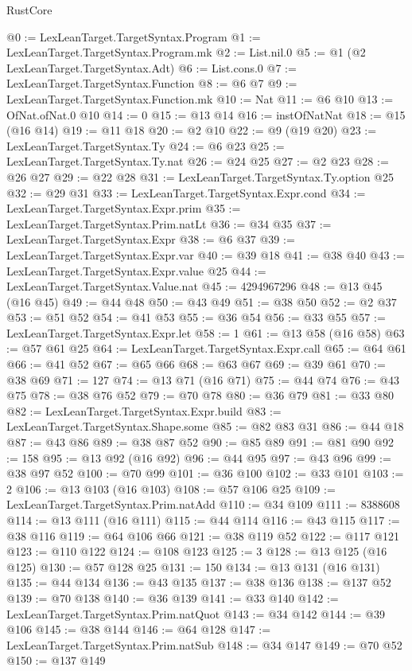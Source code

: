 \begin{lexlean}{RustCore}
\begin{coremodule}
@0 := LexLeanTarget.TargetSyntax.Program
@1 := LexLeanTarget.TargetSyntax.Program.mk
@2 := List.nil.{0}
@5 := @1 (@2 LexLeanTarget.TargetSyntax.Adt)
@6 := List.cons.{0}
@7 := LexLeanTarget.TargetSyntax.Function
@8 := @6 @7
@9 := LexLeanTarget.TargetSyntax.Function.mk
@10 := Nat
@11 := @6 @10
@13 := OfNat.ofNat.{0} @10
@14 := 0
@15 := @13 @14
@16 := instOfNatNat
@18 := @15 (@16 @14)
@19 := @11 @18
@20 := @2 @10
@22 := @9 (@19 @20)
@23 := LexLeanTarget.TargetSyntax.Ty
@24 := @6 @23
@25 := LexLeanTarget.TargetSyntax.Ty.nat
@26 := @24 @25
@27 := @2 @23
@28 := @26 @27
@29 := @22 @28
@31 := LexLeanTarget.TargetSyntax.Ty.option @25
@32 := @29 @31
@33 := LexLeanTarget.TargetSyntax.Expr.cond
@34 := LexLeanTarget.TargetSyntax.Expr.prim
@35 := LexLeanTarget.TargetSyntax.Prim.natLt
@36 := @34 @35
@37 := LexLeanTarget.TargetSyntax.Expr
@38 := @6 @37
@39 := LexLeanTarget.TargetSyntax.Expr.var
@40 := @39 @18
@41 := @38 @40
@43 := LexLeanTarget.TargetSyntax.Expr.value @25
@44 := LexLeanTarget.TargetSyntax.Value.nat
@45 := 4294967296
@48 := @13 @45 (@16 @45)
@49 := @44 @48
@50 := @43 @49
@51 := @38 @50
@52 := @2 @37
@53 := @51 @52
@54 := @41 @53
@55 := @36 @54
@56 := @33 @55
@57 := LexLeanTarget.TargetSyntax.Expr.let
@58 := 1
@61 := @13 @58 (@16 @58)
@63 := @57 @61 @25
@64 := LexLeanTarget.TargetSyntax.Expr.call
@65 := @64 @61
@66 := @41 @52
@67 := @65 @66
@68 := @63 @67
@69 := @39 @61
@70 := @38 @69
@71 := 127
@74 := @13 @71 (@16 @71)
@75 := @44 @74
@76 := @43 @75
@78 := @38 @76 @52
@79 := @70 @78
@80 := @36 @79
@81 := @33 @80
@82 := LexLeanTarget.TargetSyntax.Expr.build
@83 := LexLeanTarget.TargetSyntax.Shape.some
@85 := @82 @83 @31
@86 := @44 @18
@87 := @43 @86
@89 := @38 @87 @52
@90 := @85 @89
@91 := @81 @90
@92 := 158
@95 := @13 @92 (@16 @92)
@96 := @44 @95
@97 := @43 @96
@99 := @38 @97 @52
@100 := @70 @99
@101 := @36 @100
@102 := @33 @101
@103 := 2
@106 := @13 @103 (@16 @103)
@108 := @57 @106 @25
@109 := LexLeanTarget.TargetSyntax.Prim.natAdd
@110 := @34 @109
@111 := 8388608
@114 := @13 @111 (@16 @111)
@115 := @44 @114
@116 := @43 @115
@117 := @38 @116
@119 := @64 @106 @66
@121 := @38 @119 @52
@122 := @117 @121
@123 := @110 @122
@124 := @108 @123
@125 := 3
@128 := @13 @125 (@16 @125)
@130 := @57 @128 @25
@131 := 150
@134 := @13 @131 (@16 @131)
@135 := @44 @134
@136 := @43 @135
@137 := @38 @136
@138 := @137 @52
@139 := @70 @138
@140 := @36 @139
@141 := @33 @140
@142 := LexLeanTarget.TargetSyntax.Prim.natQuot
@143 := @34 @142
@144 := @39 @106
@145 := @38 @144
@146 := @64 @128
@147 := LexLeanTarget.TargetSyntax.Prim.natSub
@148 := @34 @147
@149 := @70 @52
@150 := @137 @149

\end{coremodule}
\end{lexlean}
